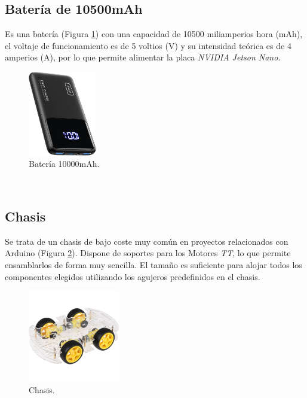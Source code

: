 \subsection{Batería de 10500mAh}
\label{subsection:battery}
Es una batería (Figura \ref{fig:battery}) con una capacidad de 10500 miliamperios hora (mAh), el voltaje de funcionamiento es de 5 voltios (V) y su intensidad teórica es de 4 amperios (A), por lo que permite alimentar la placa \textit{NVIDIA Jetson Nano}.\\

\begin{figure} [h!]
	\begin{center}
		\includegraphics[width=3cm]{figs/battery2}
	\end{center}
	\caption{Batería 10000mAh.}
	\label{fig:battery}
\end{figure}\

\subsection{Chasis}
\label{subsection:chasis}
Se trata de un chasis de bajo coste muy común en proyectos relacionados con Arduino (Figura \ref{fig:chasis}). Dispone de soportes para los Motores \textit{TT}, lo que permite ensamblarlos de forma muy sencilla. El tamaño es suficiente para alojar todos los componentes elegidos utilizando los agujeros predefinidos en el chasis.\\

\begin{figure} [h!]
	\begin{center}
		\includegraphics[width=4cm]{figs/chasis}
	\end{center}
	\caption{Chasis.}
	\label{fig:chasis}
\end{figure}\

